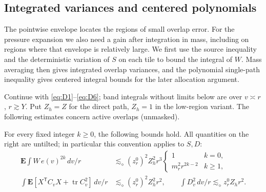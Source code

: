 \subsection{Integrated variances and centered polynomials}

The pointwise envelope locates the regions of small overlap error.
For the pressure expansion we also need a gain after integration in
mass, including on regions where that envelope is relatively large.
We first use the source inequality and the deterministic variation of
$S$ on each tile to bound the integral of $W$.  Mass averaging then
gives integrated overlap variances, and the polynomial single-path
inequality gives centered integral bounds for the later allocation
argument.

Continue with \eqref{eq:D1}--\eqref{eq:D6}; band integrals without limits below are over \(v\asymp r\), \(r\gtrsim Y\). Put \(Z_h=Z\) for the direct path, \(Z_h=1\) in the low-region variant. The following estimates concern active overlaps (unmasked).
\begin{lemma}\label{lem:statistics-integrated}
For every fixed integer $k\ge0$, the following bounds hold. All quantities on the right are untilted; in particular this convention applies to \(S,D\):
\begin{equation}
\begin{split}
 \mathbf E\int W\,e(v)^{2k}\,dv/r
    &\lesssim_\diamond (z_r^0)^2 Z_h^2 r^3
         \begin{cases}1& k=0,\\ m_r^2 r^{2k-2}& k\ge1,\end{cases}\\
 \int \mathbf E[X^{\mathsf T} C_v X+\operatorname{tr}C_v^2]\,dv/r
    &\lesssim_\diamond (z_r^0)^2 Z_h^2 r^2,\qquad
 \int D_v^2\,dv/r\lesssim_\diamond z_r^0 Z_h r^2 .
\end{split}
\tag{D7}\label{eq:D7}
\end{equation}
\end{lemma}
